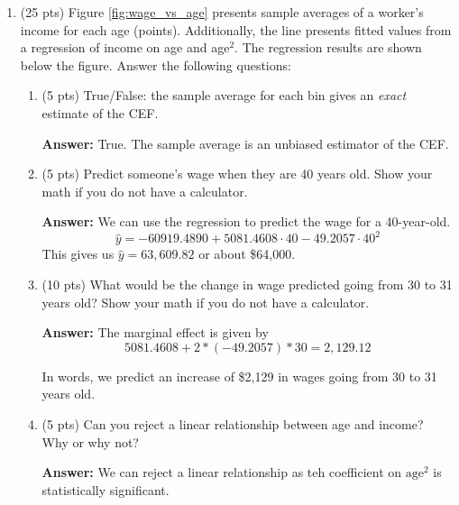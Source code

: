 \documentclass[12pt]{article}
\newcommand{\answer}[1]{{\color{blue_winged_teal}\textbf{Answer:} #1}}
\newcommand{\pts}[1]{{\color{zinc500}(#1 pts)}}
\begin{document}
\begin{enumerate}
  \answer{
    This is a bad idea because they are using the same data to train and to evaluate their model. 
    They could be overfitting their model to the training data, which would make it perform worse on new data.
  }

  \bigskip
  \item \pts{25} Figure \ref{fig:wage_vs_age} presents sample averages of a worker's income for each age (points).
  Additionally, the line presents fitted values from a regression of income on age and age$^2$.
  The regression results are shown below the figure. Answer the following questions:

  \begin{enumerate}
    \item \pts{5} True/False: the sample average for each bin gives an \emph{exact} estimate of the CEF.
    
    \answer{
      True. The sample average is an unbiased estimator of the CEF.
    }
    
    \item \pts{5} Predict someone's wage when they are 40 years old. Show your math if you do not have a calculator.
    
    \answer{
      We can use the regression to predict the wage for a 40-year-old. 
      $$
        \hat{y} = -60919.4890 + 5081.4608 \cdot 40 - 49.2057 \cdot 40^2
      $$
      This gives us $\hat{y} = 63,609.82$ or about \$64,000.
    }
    
    \item \pts{10} What would be the change in wage predicted going from 30 to 31 years old? Show your math if you do not have a calculator. 
    
    \answer{
      The marginal effect is given by 
      $$
        5081.4608 + 2 * (-49.2057) * 30 = 2,129.12
      $$

      In words, we predict an increase of \$2,129 in wages going from 30 to 31 years old.
    }
    
    \item \pts{5} Can you reject a linear relationship between age and income? Why or why not?
    
    \answer{
      We can reject a linear relationship as teh coefficient on $\text{age}^2$ is statistically significant.
    }
  \end{enumerate}


\end{enumerate}
\end{document}
